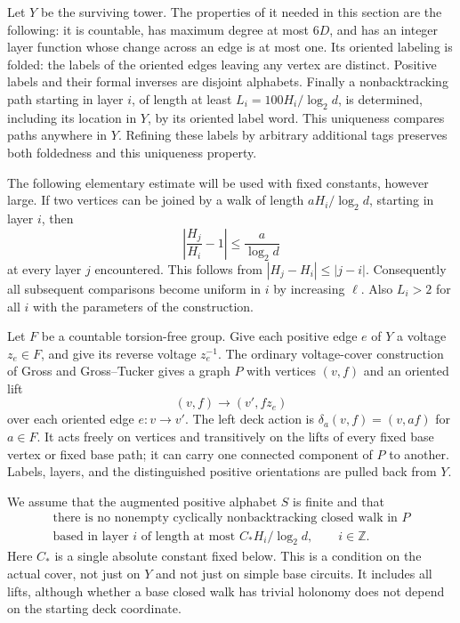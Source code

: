 Let $Y$ be the surviving tower.  The properties of it needed in this section
are the following: it is countable, has maximum degree at most $6D$, and has
an integer layer function whose change across an edge is at most one.  Its
oriented labeling is folded: the labels of the oriented edges leaving any
vertex are distinct.  Positive labels and their formal inverses are disjoint
alphabets.  Finally a nonbacktracking path starting in layer $i$, of length
at least $L_i=100H_i/\log_2d$, is determined, including its location in $Y$,
by its oriented label word.  This uniqueness compares paths anywhere in $Y$.
Refining these labels by arbitrary additional tags preserves both foldedness
and this uniqueness property.

The following elementary estimate will be used with fixed constants, however
large.  If two vertices can be joined by a walk of length
$aH_i/\log_2d$, starting in layer $i$, then
\begin{equation}
 \left|\frac{H_j}{H_i}-1\right|\le\frac{a}{\log_2d}
 \label{geo:layer-comparison}
\end{equation}
at every layer $j$ encountered.  This follows from
$|H_j-H_i|\le |j-i|$.  Consequently all subsequent comparisons become uniform
in $i$ by increasing $\ell$.  Also $L_i>2$ for all $i$ with the parameters
of the construction.

Let $F$ be a countable torsion-free group.  Give each positive edge $e$ of
$Y$ a voltage $z_e\in F$, and give its reverse voltage $z_e^{-1}$.  The ordinary voltage-cover construction of Gross and Gross--Tucker
\cite{Gross1974,GT1977} gives a graph $P$ with vertices $(v,f)$ and an oriented lift
\[
 (v,f)\longrightarrow(v',fz_e)
\]
over each oriented edge $e:v\to v'$.  The left deck action is
$\delta_a(v,f)=(v,af)$ for $a\in F$.  It acts freely on vertices and
transitively on the lifts of every fixed base vertex or fixed base path;
it can carry one connected component of $P$ to another.  Labels, layers,
and the distinguished positive orientations are pulled back from $Y$.

We assume that the augmented positive alphabet $S$ is finite and that
\begin{equation}
 \begin{gathered}
 \text{there is no nonempty cyclically nonbacktracking closed walk in $P$}\\
 \text{based in layer $i$ of length at most }
             C_*H_i/\log_2d,\qquad i\in\mathbb Z.
 \end{gathered}
 \label{geo:girth}
\end{equation}
Here $C_*$ is a single absolute constant fixed below.  This is a condition
on the actual cover, not just on $Y$ and not just on simple base circuits.
It includes all lifts, although whether a base closed walk has trivial
holonomy does not depend on the starting deck coordinate.

